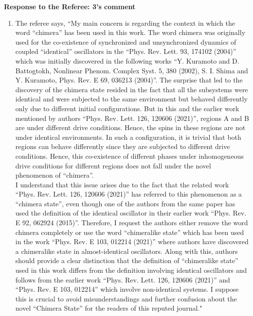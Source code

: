 \documentclass[aps,prb,reprint,showpacs,floatfix,superscriptaddress, onecolumn, nofootinbib, 10pt]{revtex4-2}
\newcommand{\comment}[1]{{\color{blue}#1}} %
\begin{document}
\begin{enumerate}
	\newpage
	\noindent \textbf{Response to the Referee: 3's comment}
	\begin{enumerate}
		\item The referee says, \comment{``My main concern is regarding the context in which the word “chimera” has been used
			in this work. The word chimera was originally used for the co-existence of synchronized and unsynchronized dynamics of coupled “identical” oscillators in the “Phys. Rev. Lett. 93, 174102 (2004)” which was initially discovered in the following
			works “Y. Kuramoto and D. Battogtokh, Nonlinear Phenom. Complex Syst. 5, 380 (2002), S. I. Shima and Y. Kuramoto, Phys. Rev. E 69, 036213 (2004)”. The surprise that led to the discovery of the chimera state resided in the fact that all the
			subsystems were identical and were subjected to the same environment but behaved differently only due to different initial configurations. But in this and the earlier work mentioned by authors “Phys. Rev. Lett. 126, 120606 (2021)”, regions A and B are under different drive conditions. Hence, the spins in these regions are not under identical environments. In such a configuration, it is trivial that both regions can behave differently since they are subjected to different drive conditions. Hence, this co-existence of different phases under inhomogeneous drive conditions for different
			regions does not fall under the novel phenomenon of “chimera”.\\
			
			I understand that this issue arises due to the fact that the related work “Phys. Rev. Lett. 126, 120606 (2021)” has referred to this phenomenon as a “chimera state”, even though one of the authors from the same paper has used the definition of the identical oscillator in their earlier work “Phys. Rev. E 92, 062924 (2015)”. Therefore, I request the authors either remove the word chimera completely or use the word “chimeralike state” which has been used in the work “Phys. Rev. E 103, 012214 (2021)” where authors have discovered a chimeralike state in almost-identical oscillators. Along with this, authors should provide a clear distinction that the definition of “chimeralike state” used in this work differs from the definition involving identical oscillators and follows from the earlier work “Phys. Rev. Lett. 126, 120606 (2021)” and “Phys. Rev. E 103, 012214” which involve non-identical systems. I
			suppose this is crucial to avoid misunderstandings and further confusion about the novel “Chimera State” for the readers of this reputed journal."}\\
		

\end{enumerate}
\end{enumerate}
\end{document}
